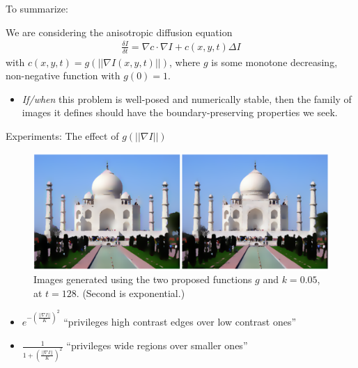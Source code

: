 \documentclass{beamer}
\begin{document}
\begin{frame}{To summarize:}

    We are considering the anisotropic diffusion equation 
    \begin{align*}
        \frac{\delta I}{\delta t}=\nabla c\cdot \nabla I+c(x,y,t)\Delta I
    \end{align*}
    with $c(x,y,t)=g\left(||\nabla I(x,y,t) ||\right)$, where $g$ is some monotone decreasing, non-negative function with $g(0)=1$.
    
    \begin{itemize}
        \item \textit{If/when} this problem is well-posed and numerically stable, then the family of images it defines should have the boundary-preserving properties we seek.
    \end{itemize}

\end{frame}

\begin{frame}{Experiments: The effect of $g\left(||\nabla I ||\right)$}

    \begin{figure}[h!]
            \centering            \includegraphics[scale=0.22]{effectofg.png} \caption{Images generated using the two proposed functions $g$ and $k=0.05$, at $t=128$. (Second is exponential.)}
    \end{figure}
    
        \begin{itemize}
            \item $e^{-\left(\frac{||\nabla I ||}{K}\right)^2}$ ``privileges high contrast edges over low contrast ones''
            \item $\frac{1}{1+\left(\frac{||\nabla I ||}{K}\right)^2}$ ``privileges wide regions over smaller ones''
        \end{itemize}

\end{frame}
\end{document}
